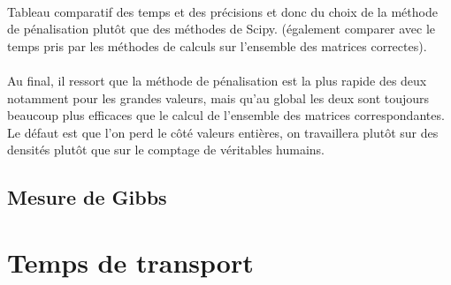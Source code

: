 \documentclass[12pt]{article}
\begin{document}
\\
Tableau comparatif des temps et des précisions et donc du choix de la méthode de pénalisation plutôt que des méthodes de Scipy. (également comparer avec le temps pris par les méthodes de calculs sur l'ensemble des matrices correctes).\\
\\
Au final, il ressort que la méthode de pénalisation est la plus rapide des deux notamment pour les grandes valeurs, mais qu'au global les deux sont toujours beaucoup plus efficaces que le calcul de l'ensemble des matrices correspondantes. Le défaut est que l'on perd le côté valeurs entières, on travaillera plutôt sur des densités plutôt que sur le comptage de véritables humains.
\subsection{Mesure de Gibbs}

\section{Temps de transport}
\end{document}
